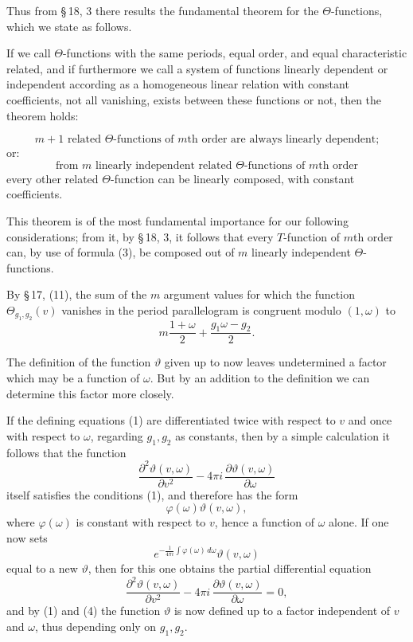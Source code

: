 \documentclass[11pt]{article}
\providecommand{\dd}{\,d}
\begin{document}
Thus from \S\,18, 3 there results the fundamental theorem for the $\Theta$-functions, which we state as follows.

If we call $\Theta$-functions with the same periods, equal order, and equal characteristic related, and if furthermore we call a system of functions linearly dependent or independent according as a homogeneous linear relation with constant coefficients, not all vanishing, exists between these functions or not, then the theorem holds:

\[
m+1 \text{ related } \Theta\text{-functions of } m\text{th order are always linearly dependent;}
\]
or:
\[
\text{from } m \text{ linearly independent related } \Theta\text{-functions of } m\text{th order}
\]
every other related $\Theta$-function can be linearly composed, with constant coefficients.

This theorem is of the most fundamental importance for our following considerations; from it, by \S\,18, 3, it follows that every $T$-function of $m$th order can, by use of formula (3), be composed out of $m$ linearly independent $\Theta$-functions.

By \S\,17, (11), the sum of the $m$ argument values for which the function $\Theta_{g_1,g_2}(v)$ vanishes in the period parallelogram is congruent modulo $(1,\omega)$ to
\[
m\frac{1+\omega}{2}+\frac{g_1\omega-g_2}{2}.
\]

The definition of the function $\vartheta$ given up to now leaves undetermined a factor which may be a function of $\omega$. But by an addition to the definition we can determine this factor more closely.

If the defining equations (1) are differentiated twice with respect to $v$ and once with respect to $\omega$, regarding $g_1,g_2$ as constants, then by a simple calculation it follows that the function
\[
\frac{\partial^2\vartheta(v,\omega)}{\partial v^2}-4\pi i\,\frac{\partial\vartheta(v,\omega)}{\partial\omega}
\]
itself satisfies the conditions (1), and therefore has the form
\[
\varphi(\omega)\vartheta(v,\omega),
\]
where $\varphi(\omega)$ is constant with respect to $v$, hence a function of $\omega$ alone. If one now sets
\[
e^{-\frac{1}{4\pi i}\int \varphi(\omega)\dd\omega}\vartheta(v,\omega)
\]
equal to a new $\vartheta$, then for this one obtains the partial differential equation
\begin{equation}
\frac{\partial^2\vartheta(v,\omega)}{\partial v^2}-4\pi i\,\frac{\partial\vartheta(v,\omega)}{\partial\omega}=0,
\tag{4}
\end{equation}
and by (1) and (4) the function $\vartheta$ is now defined up to a factor independent of $v$ and $\omega$, thus depending only on $g_1,g_2$.
\end{document}
